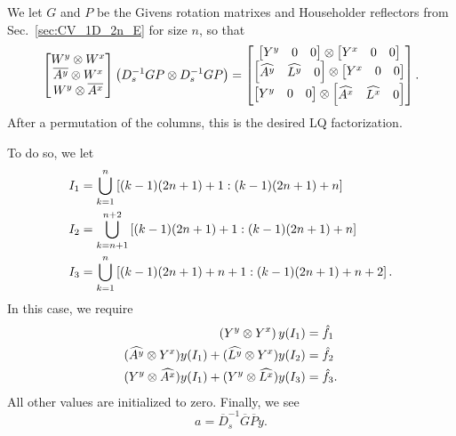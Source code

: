 We let $G$ and $P$ be the Givens rotation matrixes and Householder
reflectors from Sec.~\eqref{sec:CV_1D_2n_E} for size $n$, so that
%
\begin{equation}
    \begin{bmatrix}
        W^{y} \otimes W^{x} \\
        \overline{A^{y}} \otimes W^{x} \\
        W^{y} \otimes \overline{A^{x}} 
    \end{bmatrix}\left( D_{s}^{-1}GP\otimes D_{s}^{-1}GP \right)
    = \begin{bmatrix} \begin{bmatrix} Y^{y} & 0 & 0 \end{bmatrix}
            \otimes \begin{bmatrix} Y^{x} & 0 & 0 \end{bmatrix} \\
            \begin{bmatrix} \widehat{A^{y}} & \widehat{L^{y}} & 0 \end{bmatrix}
            \otimes \begin{bmatrix} Y^{x} & 0 & 0 \end{bmatrix} \\
            \begin{bmatrix} Y^{y} & 0 & 0 \end{bmatrix} \otimes
            \begin{bmatrix} \widehat{A^{x}} & \widehat{L^{x}} & 0 \end{bmatrix}
    \end{bmatrix}.
\end{equation}
%
After a permutation of the columns, this is the desired LQ factorization.

To do so, we let
%
\begin{align}
    I_{1} &= \bigcup_{k=1}^{n} \left[ (k-1)(2n+1) + 1:(k-1)(2n+1) + n \right]
        \nonumber\\
    I_{2} &= \bigcup_{k=n+1}^{n+2} \left[ (k-1)(2n+1) + 1:(k-1)(2n+1) + n \right]
        \nonumber\\
    I_{3} &= \bigcup_{k=1}^{n} \left[ (k-1)(2n+1) + n+1:(k-1)(2n+1) + n+2 \right].
\end{align}
%
In this case, we require
%
\begin{align}
    \left( Y^{y}\otimes Y^{x} \right)y(I_{1}) &= \hat{f}_{1} \nonumber\\
    (\widehat{A^{y}}\otimes Y^{x})y(I_{1})
        + (\widehat{L^{y}}\otimes Y^{x})y(I_{2}) &= \hat{f}_{2}
        \nonumber\\
    (Y^{y}\otimes \widehat{A^{x}})y(I_{1})
        + (Y^{y}\otimes\widehat{L^{x}})y(I_{3}) &= \hat{f}_{3}.
\end{align}
%
All other values are initialized to zero. Finally, we see
%
\begin{equation}
    a = \overline{D}_{s}^{-1}\overline{G}\overline{P}y.
\end{equation}
